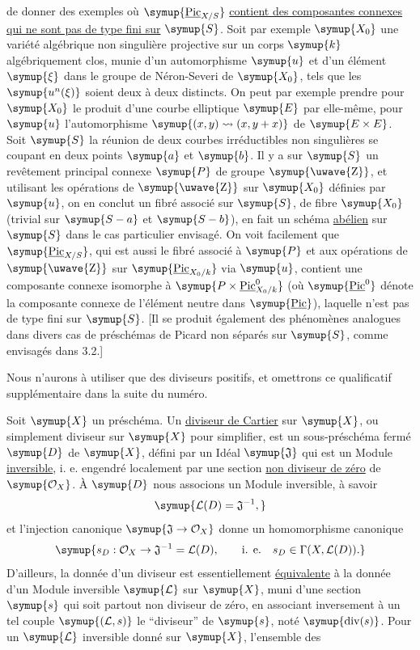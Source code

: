 de donner des exemples où $\symup{\underline{\operatorname{Pic}}_{X/S}}$ \uline{contient des composantes
connexes qui ne sont pas de type fini sur} $\symup{S}$. Soit par exemple $\symup{X_0}$ une
variété algébrique non singulière projective sur un corps $\symup{k}$ algébriquement
clos, munie d'un automorphisme $\symup{u}$ et d'un élément $\symup{\xi}$ dans le groupe de
Néron-Severi de $\symup{X_0}$, tels que les $\symup{u^n(\xi)}$ soient deux à deux distincts.
On peut par exemple prendre pour $\symup{X_0}$ le produit d'une courbe elliptique $\symup{E}$
par elle-même, pour $\symup{u}$ l'automorphisme
$\symup{(x,y)\rightsquigarrow(x,y+x)}$ de $\symup{E\times E}$. Soit $\symup{S}$ la réunion de deux courbes irréductibles non
singulières se coupant en deux points $\symup{a}$ et $\symup{b}$. Il y a sur $\symup{S}$ un revêtement
principal connexe $\symup{P}$ de groupe $\symup{\text{\uwave{Z}}}$, et utilisant les opérations de
$\symup{\text{\uwave{Z}}}$ sur $\symup{X_0}$ définies par $\symup{u}$, on en conclut un fibré associé sur $\symup{S}$,
de fibre $\symup{X_0}$ (trivial sur $\symup{S-a}$ et $\symup{S-b}$), en fait un schéma \uline{abélien} sur $\symup{S}$
dans le cas particulier envisagé. On voit facilement que
$\symup{\underline{\operatorname{Pic}}_{X/S}}$, qui est aussi le fibré associé à $\symup{P}$ et aux
opérations de $\symup{\text{\uwave{Z}}}$ sur $\symup{\underline{\operatorname{Pic}}_{X_0/k}}$ via $\symup{u}$, contient
une composante connexe isomorphe à
$\symup{P\times\underline{\operatorname{Pic}}^{0}_{X_0/k}}$ (où $\symup{\underline{\operatorname{Pic}}^{0}}$ dénote la composante connexe de l'élément neutre
dans $\symup{\underline{\operatorname{Pic}}}$), laquelle n'est pas de type fini sur $\symup{S}$. [Il se
produit également des phénomènes analogues dans divers cas de préschémas de
Picard non séparés sur $\symup{S}$, comme envisagés dans 3.2.]


Nous n'aurons à utiliser que des diviseurs positifs, et omettrons ce
qualificatif supplémentaire dans la suite du numéro.

Soit $\symup{X}$ un préschéma. Un \uline{diviseur de Cartier} sur $\symup{X}$, ou simplement
diviseur sur $\symup{X}$ pour simplifier, est un sous-préschéma fermé $\symup{D}$ de $\symup{X}$, défini
par un Idéal $\symup{\mathfrak J}$ qui est un Module \uline{inversible}, i. e. engendré localement
par une section \uline{non diviseur de zéro} de $\symup{\mathcal O_X}$. À $\symup{D}$ nous associons un
Module inversible, à savoir
\[
\symup{\mathcal L(D)=\mathfrak J^{-1},}
\]
et l'injection canonique $\symup{\mathfrak J\to\mathcal O_X}$ donne un
homomorphisme canonique
\[
\symup{s_D:\mathcal O_X\to\mathfrak J^{-1}=\mathcal L(D),
\qquad\text{i. e.}\quad s_D\in\Gamma(X,\mathcal L(D)).}
\]
D'ailleurs, la donnée d'un diviseur est essentiellement \uline{équivalente} à la
donnée d'un Module inversible $\symup{\mathcal L}$ sur $\symup{X}$, muni d'une section $\symup{s}$ qui
soit partout non diviseur de zéro, en associant inversement à un tel couple
$\symup{(\mathcal L,s)}$ le ``diviseur'' de $\symup{s}$, noté $\symup{\operatorname{div}(s)}$. Pour un
$\symup{\mathcal L}$ inversible donné sur $\symup{X}$, l'ensemble des

